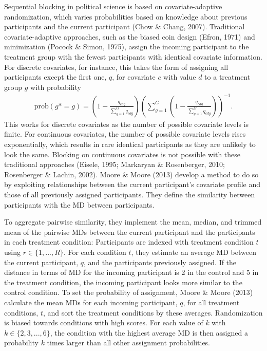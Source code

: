 \documentclass[12pt,econ]{sources/authesis}
\begin{document}
Sequential blocking in political science is based on covariate-adaptive randomization, which varies probabilities based on knowledge about previous participants and the current participant (Chow \& Chang, 2007). Traditional covariate-adaptive approaches, such as the biased coin design (Efron, 1971) and minimization (Pocock \& Simon, 1975), assign the incoming participant to the treatment group with the fewest participants with identical covariate information. For discrete covariates, for instance, this takes the form of assigning all participants except the first one, \(q\), for covariate \(c\) with value \(d\) to a treatment group \(g\) with probability
\begin{align}
\text{prob}\left(g* = g\right) = \left(1 - \frac{q_{cdg}}{\sum^G_{g = 1} q_{cdg}}\right) \left(\sum_{g = 1}^G\left(1 - \frac{q_{cdg}}{\sum^G_{g = 1} q_{cdg}}\right)\right)^{-1}.
\end{align}
This works for discrete covariates as the number of possible covariate levels is finite. For continuous covariates, the number of possible covariate levels rises exponentially, which results in rare identical participants as they are unlikely to look the same. Blocking on continuous covariates is not possible with these traditional approaches (Eisele, 1995; Markaryan \& Rosenberger, 2010; Rosenberger \& Lachin, 2002). Moore \& Moore (2013) develop a method to do so by exploiting relationships between the current participant's covariate profile and those of all previously assigned participants. They define the similarity between participants with the MD between participants.

To aggregate pairwise similarity, they implement the mean, median, and trimmed mean of the pairwise MDs between the current participant and the participants in each treatment condition: Participants are indexed with treatment condition \(t\) using \(r \in \{1,...,R\}\). For each condition \(t\), they estimate an average MD between the current participant, \(q\), and the participants previously assigned. If the distance in terms of MD for the incoming participant is 2 in the control and 5 in the treatment condition, the incoming participant looks more similar to the control condition. To set the probability of assignment, Moore \& Moore (2013) calculate the mean MDs for each incoming participant, \(q\), for all treatment conditions, \(t\), and sort the treatment conditions by these averages. Randomization is biased towards conditions with high scores. For each value of \(k\) with \(k \in \{2,3,...,6\}\), the condition with the highest average MD is then assigned a probability \(k\) times larger than all other assignment probabilities.
\end{document}
